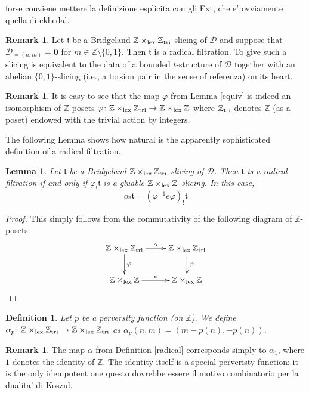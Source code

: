 \documentclass{article}
\newtheorem{lem}[thm]{Lemma}
\newtheorem{defn}[thm]{Definition}
\theoremstyle{definition}
\newtheorem{rem}[thm]{Remark}
\newcommand{\Z}{\mathbb{Z}}
\newcommand{\tee}{\mathfrak{t}}
\newcommand{\lex}{\times_{\textnormal{lex}}}
\newcommand{\triv}{\mathbb{Z}_{\textnormal{tri}}}
\begin{document}
{\color{red} forse conviene mettere la definizione esplicita con gli Ext, che e' ovviamente quella di ekhedal}.

\begin{rem}
Let $\tee$ be a  Bridgeland $\Z \lex \triv$-slicing of $\mathscr{D}$ and suppose that $\mathscr{D}_{=(n,m)}= \mathbf{0}$ for $m \in \Z \setminus \{ 0,1 \}$. Then $\tee$ is a radical filtration. To give such a slicing is equivalent to the data of a bounded $t$-structure of $\mathscr{D}$ together with an abelian $\{0,1\}$-slicing (i.e., a torsion pair in the sense of {\color{red}referenza}) on its heart.
\end{rem}

\begin{rem}
It is easy to see that the map $\varphi$ from Lemma \ref{equiv} is indeed an isomorphism of $\mathbb{Z}$-posets $\varphi \colon \Z \lex \triv \to \Z \lex \Z$ where $\triv$ denotes $\Z$ (as a poset) endowed with the  trivial action by integers. 
\end{rem}

The following Lemma shows how natural is the apparently sophisticated definition of a radical filtration. 

\begin{lem}
  Let $\tee$ be a  Bridgeland $\Z \lex \triv$-slicing of $\mathscr{D}$. Then $\tee$ is a radical filtration if and only if $\varphi_! \tee$ is a gluable $\Z \lex \Z$-slicing. In this case,
  \[
  \alpha_! \tee = ( \varphi^{-1} e \varphi)_! \tee
  \]
\end{lem}

\begin{proof}
  This simply follows from the commutativity of the following diagram of $\Z$-posets:
  \[
\xymatrix{
\Z \lex \triv \ar[r]^{\alpha} \ar[d]^{\varphi} & \Z \lex \triv \ar[d]^{\varphi} \\
\Z \lex \Z \ar[r]^{e} & \Z \lex \Z 
}
\]
\end{proof}

\begin{defn}
  Let $p$ be a perversity function (on $\Z$). We define $\alpha_p \colon \Z \lex \triv \to \Z \lex \triv$ as $\alpha_p(n,m)=(m-p(n),-p(n))$. 
\end{defn}

\begin{rem}
The map $\alpha$ from Definition \ref{radical} corresponds simply to $\alpha_1$, where $1$ denotes the identity of $\mathbb{Z}$. The identity itself is a special perveristy function: it is the only idempotent one {\color{red} questo dovrebbe essere il motivo combinatorio per la dualita' di Koszul}. 
\end{rem}
\end{document}
